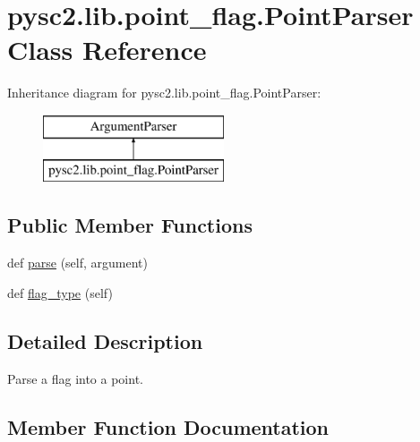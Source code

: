 \hypertarget{classpysc2_1_1lib_1_1point__flag_1_1_point_parser}{}\section{pysc2.\+lib.\+point\+\_\+flag.\+Point\+Parser Class Reference}
\label{classpysc2_1_1lib_1_1point__flag_1_1_point_parser}
Inheritance diagram for pysc2.\+lib.\+point\+\_\+flag.\+Point\+Parser\+:\begin{figure}[H]
\begin{center}
\leavevmode
\includegraphics[height=2.000000cm]{classpysc2_1_1lib_1_1point__flag_1_1_point_parser}
\end{center}
\end{figure}
\subsection*{Public Member Functions}
\begin{DoxyCompactItemize}
\item 
def \mbox{\hyperlink{classpysc2_1_1lib_1_1point__flag_1_1_point_parser_a1b67e8dc82473826ef576675e06ec672}{parse}} (self, argument)
\item 
def \mbox{\hyperlink{classpysc2_1_1lib_1_1point__flag_1_1_point_parser_af2e38da04ae0dabb65e1dc509d7e6184}{flag\+\_\+type}} (self)
\end{DoxyCompactItemize}


\subsection{Detailed Description}
\begin{DoxyVerb}Parse a flag into a point.\end{DoxyVerb}
 

\subsection{Member Function Documentation}
\mbox{\label{classpysc2_1_1lib_1_1point__flag_1_1_point_parser_af2e38da04ae0dabb65e1dc509d7e6184}} 
